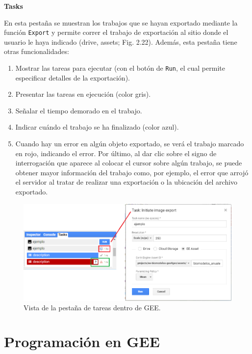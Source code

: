 \documentclass[
  12pt,
  letterpaper,
  twoside]{book}
\providecommand{\tightlist}{%
  \setlength{\itemsep}{0pt}\setlength{\parskip}{0pt}}
\begin{document}
\textbf{Tasks}

En esta pestaña se muestran los trabajos que se hayan exportado mediante la función \texttt{Export} y permite correr el trabajo de exportación al sitio donde el usuario le haya indicado (drive, assets; Fig. 2.22). Además, esta pestaña tiene otras funcionalidades:

\begin{enumerate}
\def\labelenumi{\arabic{enumi}.}
\tightlist
\item
  Mostrar las tareas para ejecutar (con el botón de \texttt{Run}, el cual permite especificar detalles de la exportación).
\item
  Presentar las tareas en ejecución (color gris).
\item
  Señalar el tiempo demorado en el trabajo.
\item
  Indicar cuándo el trabajo se ha finalizado (color azul).
\item
  Cuando hay un error en algún objeto exportado, se verá el trabajo marcado en rojo, indicando el error. Por último, al dar clic sobre el signo de interrogación que aparece al colocar el cursor sobre algún trabajo, se puede obtener mayor información del trabajo como, por ejemplo, el error que arrojó el servidor al tratar de realizar una exportación o la ubicación del archivo exportado.
\end{enumerate}

\begin{figure}[btp]

{\centering \includegraphics[width=0.8\linewidth]{Img/task} 

}

\caption{Vista de la pestaña de tareas dentro de GEE.}\label{fig:unnamed-chunk-23}
\end{figure}

\hypertarget{programaciuxf3n-en-gee}{%
\section{Programación en GEE}\label{programaciuxf3n-en-gee}}
\end{document}
